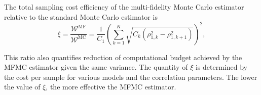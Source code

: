 

The total sampling cost efficiency of the multi-fidelity Monte Carlo estimator relative to the standard Monte Carlo estimator is
%
\begin{equation}\label{eq:MFMC_sampling_cost_efficiency}
    \xi = \frac{\mathcal{W}^\text{MF}}{\mathcal{W}^\text{MC}} = \frac{1}{C_1} \left(\sum_{k=1}^K\sqrt{C_k\left(\rho_{1,k}^2 - \rho_{1,k+1}^2\right)}\right)^2,
\end{equation}
%

This ratio also quantifies reduction of computational budget achieved by the MFMC estimator given the same variance. The quantity of $\xi$ is determined by the cost per sample for various models and the correlation parameters. The lower the value of $\xi$, the more effective the MFMC estimator.


